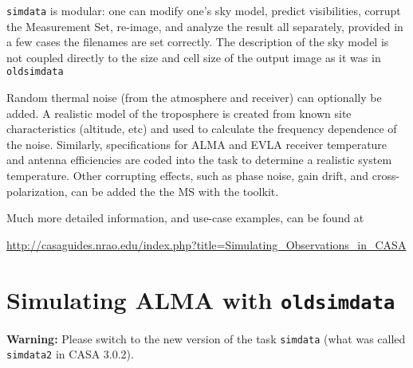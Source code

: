 {\tt simdata} is modular: one can
modify one's sky model, predict visibilities, corrupt the Measurement
Set, re-image, and analyze the result all separately, provided in a
few cases the filenames are set correctly.  The description of the sky
model is not coupled directly to the size and cell size of the
output image as it was in {\tt oldsimdata}

Random thermal noise (from the atmosphere and receiver) can optionally
be added. A realistic model of the troposphere is created from known
site characteristics (altitude, etc) and used to calculate the
frequency dependence of the noise.  Similarly, specifications for ALMA
and EVLA receiver temperature and antenna efficiencies are coded into
the task to determine a realistic system temperature.  Other
corrupting effects, such as phase noise, gain drift, and
cross-polarization, can be added the the MS with the toolkit.

Much more detailed information, and use-case examples, can be found at 

\url{http://casaguides.nrao.edu/index.php?title=Simulating_Observations_in_CASA}


\section{Simulating ALMA with {\tt oldsimdata}}
\label{section:sim.almasimmos_old}

{\bfseries Warning:} Please switch to the new version of the task {\tt simdata}
(what was called {\tt simdata2} in CASA 3.0.2).

